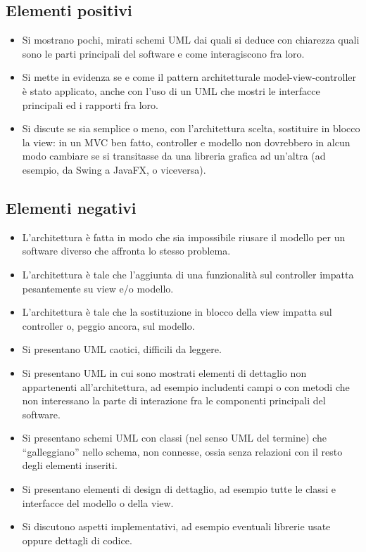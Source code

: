 \documentclass[a4paper,12pt]{report}
\begin{document}
\subsection*{Elementi positivi}
\begin{itemize}
 \item Si mostrano pochi, mirati schemi UML dai quali si deduce con chiarezza quali sono le parti principali del software e come interagiscono fra loro.
 \item Si mette in evidenza se e come il pattern architetturale model-view-controller è stato applicato, anche con l'uso di un UML che mostri le interfacce principali ed i rapporti fra loro.
 \item Si discute se sia semplice o meno, con l'architettura scelta, sostituire in blocco la view:
 	in un MVC ben fatto, controller e modello non dovrebbero in alcun modo cambiare se si transitasse da una libreria grafica ad un'altra (ad esempio, da Swing a JavaFX, o viceversa).
\end{itemize}

\subsection*{Elementi negativi}
\begin{itemize}
 \item L'architettura è fatta in modo che sia impossibile riusare il modello per un software diverso che affronta lo stesso problema.
 \item L'architettura è tale che l'aggiunta di una funzionalità sul controller impatta pesantemente su view e/o modello.
 \item L'architettura è tale che la sostituzione in blocco della view impatta sul controller o, peggio ancora, sul modello.
 \item Si presentano UML caotici, difficili da leggere.
 \item Si presentano UML in cui sono mostrati elementi di dettaglio non appartenenti all'architettura, ad esempio includenti campi o con metodi che non interessano la parte di interazione fra le componenti principali del software.
 \item Si presentano schemi UML con classi (nel senso UML del termine) che ``galleggiano'' nello schema, non connesse, ossia senza relazioni con il resto degli elementi inseriti.
 \item Si presentano elementi di design di dettaglio, ad esempio tutte le classi e interfacce del modello o della view.
 \item Si discutono aspetti implementativi, ad esempio eventuali librerie usate oppure dettagli di codice.
\end{itemize}
\end{document}
